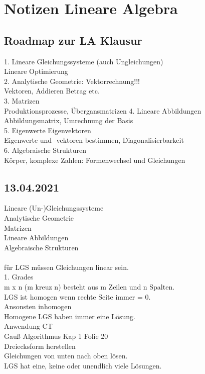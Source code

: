 \documentclass{article}
\begin{document}
	
	\section*{Notizen Lineare Algebra}
	\subsection*{Roadmap zur LA Klausur}
	1. Lineare Gleichungssysteme (auch Ungleichungen) \\
	Lineare Optimierung \\
	2. Analytische Geometrie: Vektorrechnung!!! \\
	Vektoren, Addieren Betrag etc. \\
	3. Matrizen \\
	Produktionsprozesse, Übergansmatrizen 
	4. Lineare Abbildungen \\
	Abbildungsmatrix, Umrechnung der Basis \\
	5. Eigenwerte Eigenvektoren \\
	Eigenwerte und -vektoren bestimmen, Diagonalisierbarkeit \\
	6. Algebraische Strukturen \\
	Körper, komplexe Zahlen: Formenwechsel und Gleichungen
	
	\subsection*{13.04.2021}
	
	Lineare (Un-)Gleichungssysteme \\
	Analytische Geometrie  \\
	Matrizen \\
	Lineare Abbildungen  \\
	Algebraische Strukturen \\
	\\
	für LGS müssen Gleichungen linear sein. \\
	1. Grades \\
	m x n (m kreuz n) besteht aus m Zeilen und n Spalten. \\
	LGS ist homogen wenn rechte Seite immer = 0. \\
	Ansonsten inhomogen \\
	Homogene LGS haben immer eine Lösung. \\
	Anwendung CT \\
	Gauß Algorithmus Kap 1 Folie 20 \\
	Dreiecksform herstellen \\
	Gleichungen von unten nach oben lösen. \\
	LGS hat eine, keine oder unendlich viele Lösungen. \\
\end{document}
